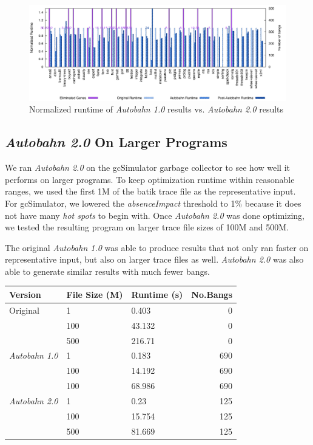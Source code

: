 \documentclass[format=sigplan]{acmart}
\newcommand{\hotspots}[0]{\textit{hot spots}}
\newcommand{\Ao}[0]{\textit{Autobahn 1.0}}
\newcommand{\At}[0]{\textit{Autobahn 2.0}}
\newcommand{\absim}[0]{\textit{absenceImpact}}
\begin{document}
\begin{figure}
\includegraphics[width=\textwidth]{pap2}
\caption{Normalized runtime of \Ao{} results vs. \At{} results}
\end{figure}

\subsection{\At{} On Larger Programs}

We ran \At{} on the gcSimulator garbage collector to see how well it performs on larger programs. To keep optimization runtime within reasonable ranges, we used the first 1M of the batik trace file as the representative input. For gcSimulator, we lowered the \absim{} threshold to 1\% because it does not have many \hotspots{} to begin with. Once \At{} was done optimizing, we tested the resulting program on larger trace file sizes of 100M and 500M. 

The original \Ao{} was able to produce results that not only ran faster on representative input, but also on larger trace files as well. \At{} was also able to generate similar results with much fewer bangs. 

\begin{tabular}{lllr}
\hline
Version   & File Size (M) & Runtime (s) & No.Bangs \\
\hline
Original      & 1   &   0.403	 & 0   \\
          & 100        & 43.132      & 0 \\
       & 500     &  216.71 & 0 \\
\Ao{}       & 1     & 0.183    &  690\\
          & 100        & 14.192	 &  690\\
                 & 100        & 68.986	& 690\\
\At{}      & 1   &  0.23 & 125    \\
          & 100        & 15.754 & 125      \\
       & 500    & 81.669 & 125    \\

\hline
\end{tabular}
\end{document}
